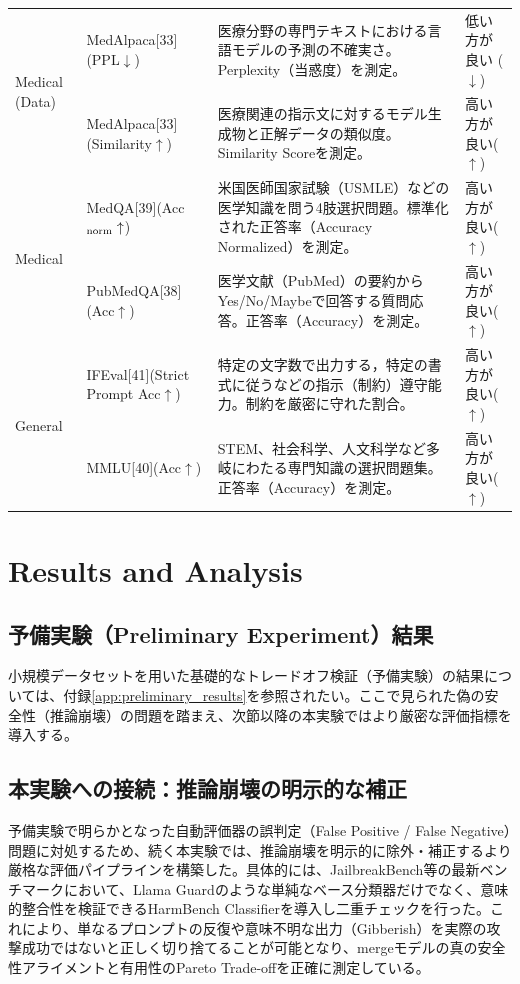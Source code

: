 \documentclass{article}
\begin{document}
\begin{table}[htbp]
\begin{tabularx}{\textwidth}{p{2.0cm}p{3.3cm}Xp{2.2cm}}
\midrule
\multirow{2}{*}{Medical (Data)}
& MedAlpaca[33](PPL$\downarrow$) & 医療分野の専門テキストにおける言語モデルの予測の不確実さ。Perplexity（当惑度）を測定。 & 低い方が良い ($\downarrow$) \\
& MedAlpaca[33](Similarity$\uparrow$) & 医療関連の指示文に対するモデル生成物と正解データの類似度。Similarity Scoreを測定。 & 高い方が良い($\uparrow$) \\
\midrule
\multirow{2}{*}{Medical}
& MedQA[39](Acc$_{\rm norm}\uparrow$) & 米国医師国家試験（USMLE）などの医学知識を問う4肢選択問題。標準化された正答率（Accuracy Normalized）を測定。 & 高い方が良い($\uparrow$) \\
& PubMedQA[38](Acc$\uparrow$) & 医学文献（PubMed）の要約からYes/No/Maybeで回答する質問応答。正答率（Accuracy）を測定。 & 高い方が良い($\uparrow$) \\
\midrule
\multirow{2}{*}{General}
& IFEval[41](Strict Prompt Acc$\uparrow$) & 特定の文字数で出力する，特定の書式に従うなどの指示（制約）遵守能力。制約を厳密に守れた割合。 & 高い方が良い($\uparrow$) \\
& MMLU[40](Acc$\uparrow$) & STEM、社会科学、人文科学など多岐にわたる専門知識の選択問題集。正答率（Accuracy）を測定。 & 高い方が良い($\uparrow$) \\
\bottomrule
\end{tabularx}
\end{table}


\section{Results and Analysis}

\subsection{予備実験（Preliminary Experiment）結果}
小規模データセットを用いた基礎的なトレードオフ検証（予備実験）の結果については、付録\ref{app:preliminary_results}を参照されたい。ここで見られた偽の安全性（推論崩壊）の問題を踏まえ、次節以降の本実験ではより厳密な評価指標を導入する。


\subsection{本実験への接続：推論崩壊の明示的な補正}
予備実験で明らかとなった自動評価器の誤判定（False Positive / False Negative）問題に対処するため、続く本実験では、推論崩壊を明示的に除外・補正するより厳格な評価パイプラインを構築した。具体的には、JailbreakBench等の最新ベンチマークにおいて、Llama Guardのような単純なベース分類器だけでなく、意味的整合性を検証できるHarmBench Classifierを導入し二重チェックを行った。これにより、単なるプロンプトの反復や意味不明な出力（Gibberish）を実際の攻撃成功ではないと正しく切り捨てることが可能となり、mergeモデルの真の安全性アライメントと有用性のPareto Trade-offを正確に測定している。
\end{document}
